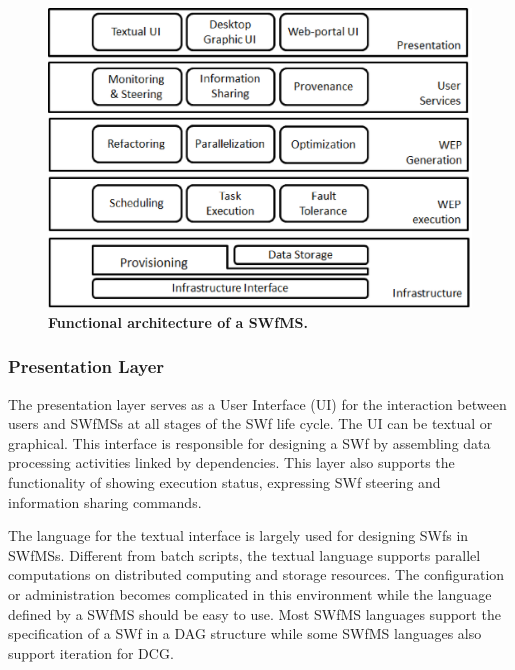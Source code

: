 \begin{figure}
\begin{centering}
\captionsetup{justification=centering}
\includegraphics[width=129mm]{figures/f3}
\par\end{centering}
\caption{\textbf{Functional architecture of a SWfMS. }}
\label{fig:f3} 
\end{figure}



\subsubsection{Presentation Layer}
\label{sec:subsub:PL}

The presentation layer serves as a User Interface (UI) for the interaction
between users and SWfMSs at all stages of the SWf
life cycle. The UI can be textual or graphical. This interface is responsible for designing a SWf by assembling data processing activities linked by dependencies. 
This layer also supports the functionality of showing execution status, expressing SWf steering and information sharing commands.

The language for the textual interface is largely used for designing SWfs in SWfMSs. Different from batch scripts, the textual language
supports parallel computations on distributed computing and storage
resources. The configuration or administration becomes complicated in this environment while the language
defined by a SWfMS should be easy to use. Most SWfMS languages support
the specification of a SWf in a DAG structure while some SWfMS languages also support iteration for DCG.

